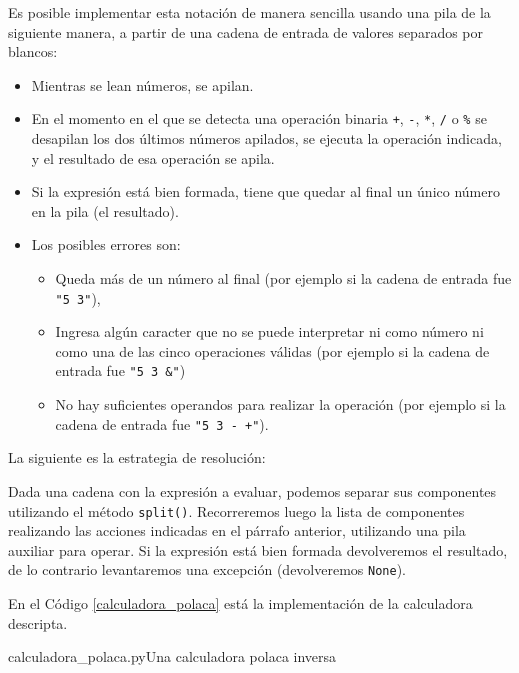 Es posible implementar esta notación de manera sencilla usando una pila de
la siguiente manera, a partir de una cadena de entrada de valores separados
por blancos:

\begin{itemize}
\item Mientras se lean números, se apilan.

\item En el momento en el que se detecta una operación binaria \verb|+|,
\verb|-|, \verb|*|, \verb|/| o \verb|%| se desapilan los dos últimos
números apilados, se ejecuta la operación indicada, y el resultado de esa
operación se apila.

\item Si la expresión está bien formada, tiene que quedar al final un único
número en la pila (el resultado).

\item Los posibles errores son:

\begin{itemize}
\item Queda más de un número al final (por ejemplo si la cadena de entrada
fue \verb|"5 3"|),

\item Ingresa algún caracter que no se puede interpretar ni como número ni como
una de las cinco operaciones válidas (por ejemplo si la cadena de entrada
fue \verb|"5 3 &"|)

\item No hay suficientes operandos para realizar la operación (por ejemplo
si la cadena de entrada fue \verb|"5 3 - +"|).
\end{itemize}
\end{itemize}

La siguiente es la estrategia de resolución:

Dada una cadena con la expresión a evaluar, podemos separar sus componentes
utilizando el método \lstinline!split()!.  Recorreremos luego la lista de
componentes realizando las acciones indicadas en el párrafo anterior,
utilizando una pila auxiliar para operar. Si la expresión está bien formada
devolveremos el resultado, de lo contrario levantaremos una excepción
(devolveremos \lstinline!None!).

En el Código \ref{calculadora_polaca} está la implementación de la
calculadora descripta.

\begin{codigo}{\label{calculadora_polaca} calculadora\_polaca.py}{Una calculadora polaca inversa}

\end{codigo}

